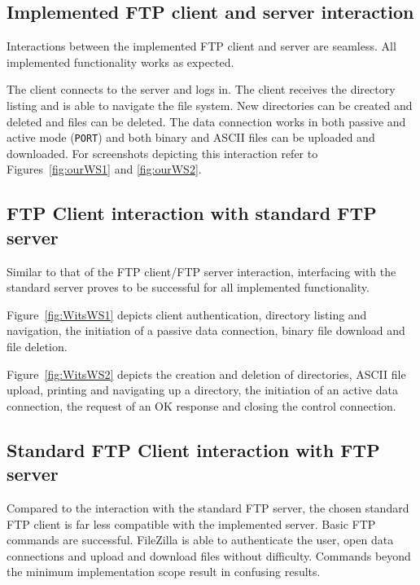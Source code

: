 \documentclass[10pt,twocolumn]{witseiepaper}
\begin{document}
\subsection{Implemented FTP client and server interaction}

Interactions between the implemented FTP client and server are seamless. All implemented functionality works as expected.

The client connects to the server and logs in. The client receives the directory listing and is able to navigate the file system. New directories can be created and deleted and files can be deleted. The data connection works in both passive and active mode (\texttt{PORT}) and both binary and ASCII files can be uploaded and downloaded. For screenshots depicting this interaction refer to Figures~\ref{fig:ourWS1} and \ref{fig:ourWS2}.
 

\subsection{FTP Client interaction with standard FTP server}

Similar to that of the FTP client/FTP server interaction, interfacing with the standard server proves to be successful for all implemented functionality. 

Figure~\ref{fig:WitsWS1} depicts client authentication, directory listing and navigation, the initiation of a passive data connection, binary file download and file deletion. 

Figure~\ref{fig:WitsWS2} depicts the creation and deletion of directories, ASCII file upload, printing and navigating up a directory, the initiation of an active data connection, the request of an OK response and closing the control connection.

\subsection{Standard FTP Client interaction with FTP server}

Compared to the interaction with the standard FTP server, the chosen standard FTP client is far less compatible with the implemented server. Basic FTP commands are successful. FileZilla is able to authenticate the user, open data connections and upload and download files without difficulty. Commands beyond the minimum implementation scope result in confusing results.
\end{document}
